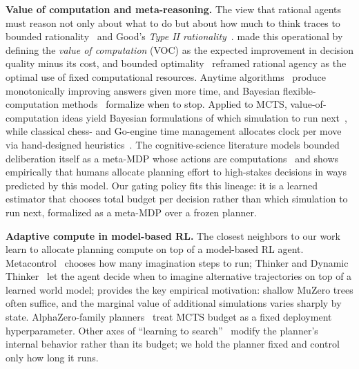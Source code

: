 \documentclass{article}
\begin{document}
\noindent\textbf{Value of computation and meta-reasoning.}
The view that rational agents must reason not only about what to do but
about how much to think traces to bounded
rationality~\citep{simon1972theories} and Good's \emph{Type II
rationality}~\citep{good1952rational}.
\citet{russell1991right} made this operational by defining the
\emph{value of computation} (VOC) as the expected improvement in
decision quality minus its cost, and bounded
optimality~\citep{russell1991architecture} reframed rational agency as the
optimal use of fixed computational resources.
Anytime
algorithms~\citep{dean1988analysis,zilberstein1996using,likhachev2003ara,korf1990rta}
produce monotonically improving answers given more time, and Bayesian
flexible-computation methods~\citep{horvitz1989reflection} formalize
when to stop.
Applied to MCTS, value-of-computation ideas yield Bayesian formulations
of which simulation to run
next~\citep{hay2012selecting,tolpin2012simple,sezener2020static,lin2015metareasoning},
while classical chess- and Go-engine time management allocates clock
per move via hand-designed
heuristics~\citep{baier2016time,huang2010timemanagement,baudivs2011pachi}.
The cognitive-science literature models bounded deliberation itself as
a meta-MDP whose actions are
computations~\citep{lieder2017strategy,griffiths2019doing,callaway2018learning,cope_learning_2023}
and shows empirically that humans allocate planning effort to
high-stakes decisions in ways predicted by this model.
Our gating policy fits this lineage: it is a learned estimator
that chooses total budget per decision rather than which simulation to
run next, formalized as a meta-MDP over a frozen planner.

\noindent\textbf{Adaptive compute in model-based RL.}
The closest neighbors to our work learn to allocate planning compute on
top of a model-based RL agent.
Metacontrol~\citep{hamrick2017metacontrol} chooses how many imagination
steps to run; Thinker and Dynamic
Thinker~\citep{chung2023thinker,wang2024dynamic} let the agent decide
when to imagine alternative trajectories on top of a learned world
model;
\citet{hamrick2021role} provides the key empirical motivation: shallow
MuZero trees often suffice, and the marginal value of additional
simulations varies sharply by state.
AlphaZero-family
planners~\citep{silver2018general,schrittwieser2020muzero,danihelka2022policy}
treat MCTS budget as a fixed deployment hyperparameter.
Other axes of ``learning to
search''~\citep{guez2018mctsnets,farquhar2018treeqn,hamrick2020save,racaniere2017i2a}
modify the planner's internal behavior rather than its budget; we hold
the planner fixed and control only how long it runs.
\end{document}
